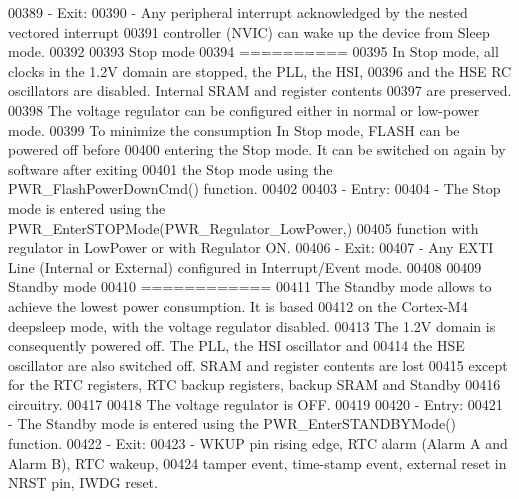 \begin{DoxyCode}
00389 \textcolor{comment}{    - Exit:}
00390 \textcolor{comment}{      - Any peripheral interrupt acknowledged by the nested vectored interrupt }
00391 \textcolor{comment}{        controller (NVIC) can wake up the device from Sleep mode.}
00392 \textcolor{comment}{}
00393 \textcolor{comment}{   Stop mode}
00394 \textcolor{comment}{   ==========}
00395 \textcolor{comment}{   In Stop mode, all clocks in the 1.2V domain are stopped, the PLL, the HSI,}
00396 \textcolor{comment}{   and the HSE RC oscillators are disabled. Internal SRAM and register contents }
00397 \textcolor{comment}{   are preserved.}
00398 \textcolor{comment}{   The voltage regulator can be configured either in normal or low-power mode.}
00399 \textcolor{comment}{   To minimize the consumption In Stop mode, FLASH can be powered off before }
00400 \textcolor{comment}{   entering the Stop mode. It can be switched on again by software after exiting }
00401 \textcolor{comment}{   the Stop mode using the PWR\_FlashPowerDownCmd() function. }
00402 \textcolor{comment}{   }
00403 \textcolor{comment}{    - Entry:}
00404 \textcolor{comment}{      - The Stop mode is entered using the PWR\_EnterSTOPMode(PWR\_Regulator\_LowPower,) }
00405 \textcolor{comment}{        function with regulator in LowPower or with Regulator ON.}
00406 \textcolor{comment}{    - Exit:}
00407 \textcolor{comment}{      - Any EXTI Line (Internal or External) configured in Interrupt/Event mode.}
00408 \textcolor{comment}{      }
00409 \textcolor{comment}{   Standby mode}
00410 \textcolor{comment}{   ============}
00411 \textcolor{comment}{   The Standby mode allows to achieve the lowest power consumption. It is based }
00412 \textcolor{comment}{   on the Cortex-M4 deepsleep mode, with the voltage regulator disabled. }
00413 \textcolor{comment}{   The 1.2V domain is consequently powered off. The PLL, the HSI oscillator and }
00414 \textcolor{comment}{   the HSE oscillator are also switched off. SRAM and register contents are lost }
00415 \textcolor{comment}{   except for the RTC registers, RTC backup registers, backup SRAM and Standby }
00416 \textcolor{comment}{   circuitry.}
00417 \textcolor{comment}{   }
00418 \textcolor{comment}{   The voltage regulator is OFF.}
00419 \textcolor{comment}{      }
00420 \textcolor{comment}{    - Entry:}
00421 \textcolor{comment}{      - The Standby mode is entered using the PWR\_EnterSTANDBYMode() function.}
00422 \textcolor{comment}{    - Exit:}
00423 \textcolor{comment}{      - WKUP pin rising edge, RTC alarm (Alarm A and Alarm B), RTC wakeup,}
00424 \textcolor{comment}{        tamper event, time-stamp event, external reset in NRST pin, IWDG reset.              }

\end{DoxyCode}
